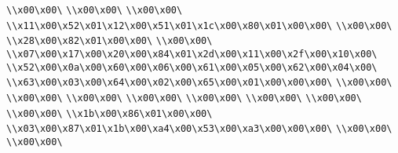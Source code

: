 \verb|\\x00\x00\|\newline
\verb|\\x00\x00\|\newline
\verb|\\x00\x00\|\newline
\verb|\\x11\x00\x52\x01\x12\x00\x51\x01\x1c\x00\x80\x01\x00\x00\|\newline
\verb|\\x00\x00\|\newline
\verb|\\x28\x00\x82\x01\x00\x00\|\newline
\verb|\\x00\x00\|\newline
\verb|\\x07\x00\x17\x00\x20\x00\x84\x01\x2d\x00\x11\x00\x2f\x00\x10\x00\|\newline
\verb|\\x52\x00\x0a\x00\x60\x00\x06\x00\x61\x00\x05\x00\x62\x00\x04\x00\|\newline
\verb|\\x63\x00\x03\x00\x64\x00\x02\x00\x65\x00\x01\x00\x00\x00\|\newline
\verb|\\x00\x00\|\newline
\verb|\\x00\x00\|\newline
\verb|\\x00\x00\|\newline
\verb|\\x00\x00\|\newline
\verb|\\x00\x00\|\newline
\verb|\\x00\x00\|\newline
\verb|\\x00\x00\|\newline
\verb|\\x00\x00\|\newline
\verb|\\x1b\x00\x86\x01\x00\x00\|\newline
\verb|\\x03\x00\x87\x01\x1b\x00\xa4\x00\x53\x00\xa3\x00\x00\x00\|\newline
\verb|\\x00\x00\|\newline
\verb|\\x00\x00\|\newline

